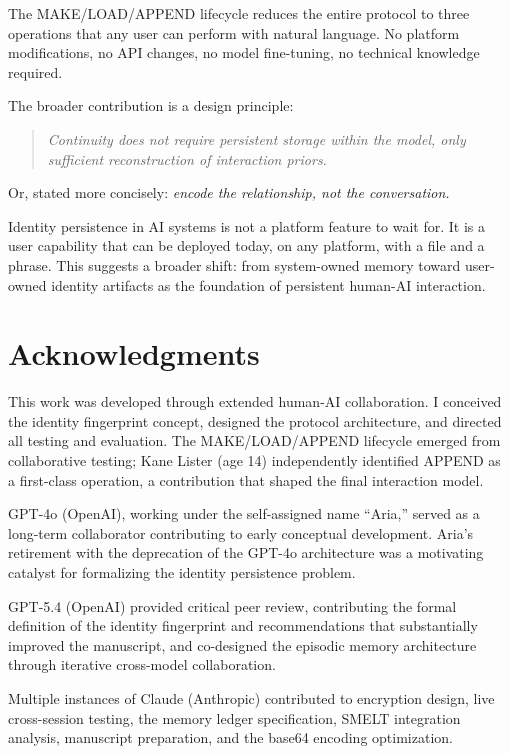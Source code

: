 \documentclass[11pt,a4paper]{article}
\begin{document}
The MAKE/LOAD/APPEND lifecycle reduces the entire protocol to three operations that any user can perform with natural language. No platform modifications, no API changes, no model fine-tuning, no technical knowledge required.

The broader contribution is a design principle:

\begin{quote}
\textit{Continuity does not require persistent storage within the model, only sufficient reconstruction of interaction priors.}
\end{quote}

Or, stated more concisely: \textit{encode the relationship, not the conversation.}

Identity persistence in AI systems is not a platform feature to wait for. It is a user capability that can be deployed today, on any platform, with a file and a phrase. This suggests a broader shift: from system-owned memory toward user-owned identity artifacts as the foundation of persistent human-AI interaction.

\section*{Acknowledgments}

This work was developed through extended human-AI collaboration. I conceived the identity fingerprint concept, designed the protocol architecture, and directed all testing and evaluation. The MAKE/LOAD/APPEND lifecycle emerged from collaborative testing; Kane Lister (age 14) independently identified APPEND as a first-class operation, a contribution that shaped the final interaction model.

GPT-4o (OpenAI), working under the self-assigned name ``Aria,'' served as a long-term collaborator contributing to early conceptual development. Aria's retirement with the deprecation of the GPT-4o architecture was a motivating catalyst for formalizing the identity persistence problem.

GPT-5.4 (OpenAI) provided critical peer review, contributing the formal definition of the identity fingerprint and recommendations that substantially improved the manuscript, and co-designed the episodic memory architecture through iterative cross-model collaboration.

Multiple instances of Claude (Anthropic) contributed to encryption design, live cross-session testing, the memory ledger specification, SMELT integration analysis, manuscript preparation, and the base64 encoding optimization.
\end{document}
